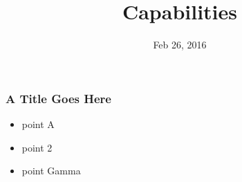 \documentclass{beamer}
\title{Capabilities}
\date{Feb 26, 2016}
\begin{document}
\frame{\titlepage}

\begin{frame}
  \frametitle{A Title Goes Here}
  \begin{itemize}
  \item point A
  \item point 2
  \item point Gamma
  \end{itemize}
\end{frame}
\end{document}
